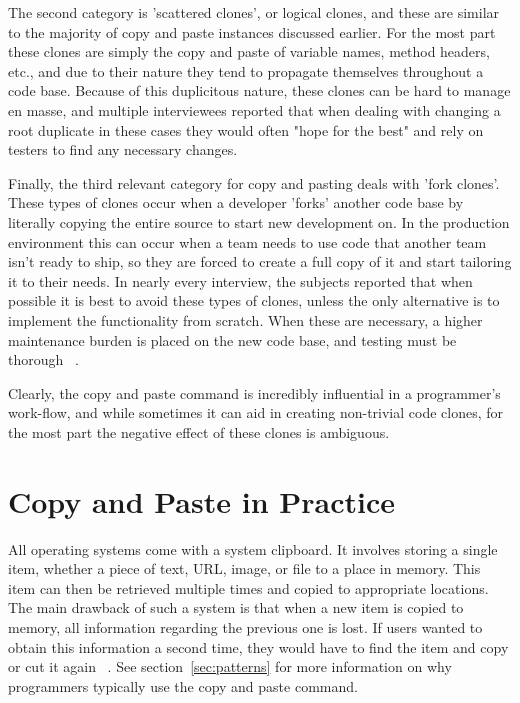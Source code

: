 \documentclass{acm_proc_article-sp}
\begin{document}
The second category is 'scattered clones', or logical clones, and these are similar to the majority of copy and paste instances discussed earlier. For the most part these clones are simply the copy and paste of variable names, method headers, etc., and due to their nature they tend to propagate themselves throughout a code base. Because of this duplicitous nature, these clones can be hard to manage en masse, and multiple interviewees reported that when dealing with changing a root duplicate in these cases they would often "hope for the best" and rely on testers to find any  necessary changes.

Finally, the third relevant category for copy and pasting deals with 'fork clones'. These types of clones occur when a developer 'forks' another code base by literally copying the entire source to start new development on. In the production environment this can occur when a team needs to use code that another team isn't ready to ship, so they are forced to create a full copy of it and start tailoring it to their needs. In nearly every interview, the subjects reported that when possible it is best to avoid these types of clones, unless the only alternative is to implement the functionality from scratch. When these are necessary, a higher maintenance burden is placed on the new code base, and testing must be thorough ~\cite{devWorkHabits}.

Clearly, the copy and paste command is incredibly influential in a programmer's work-flow, and while sometimes it can aid in creating non-trivial code clones, for the most part the negative effect of these clones is ambiguous. 

\section{Copy and Paste in Practice}\label{sec:copy}

All operating systems come with a system clipboard. It involves storing a single item, whether a piece of text, URL, image, or file to a place in memory. This item can then be retrieved multiple times and copied to appropriate locations. The main drawback of such a system is that when a new item is copied to memory, all information regarding the previous one is lost. If users wanted to obtain this information a second time, they would have to find the item and copy or cut it again ~\cite{codeReuse}. See section~\ref{sec:patterns} for more information on why programmers typically use the copy and paste command.
\end{document}

